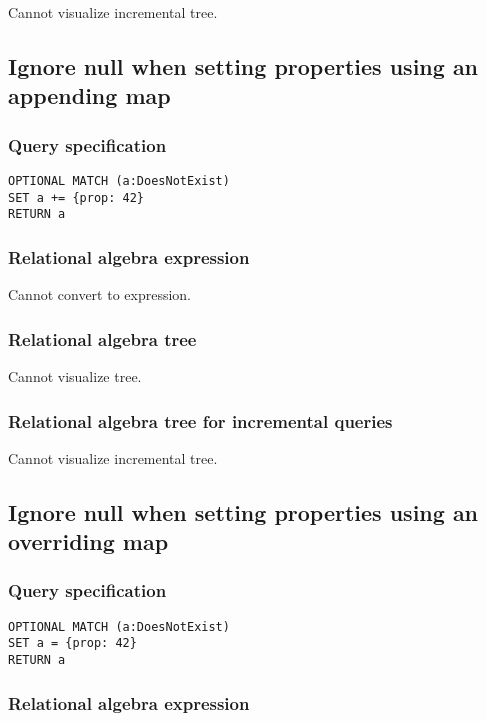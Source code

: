 Cannot visualize incremental tree.

\subsection{Ignore null when setting properties using an appending map}

\subsubsection*{Query specification}

\begin{lstlisting}
OPTIONAL MATCH (a:DoesNotExist)
SET a += {prop: 42}
RETURN a
\end{lstlisting}

\subsubsection*{Relational algebra expression}

Cannot convert to expression.

\subsubsection*{Relational algebra tree}

Cannot visualize tree.

\subsubsection*{Relational algebra tree for incremental queries}

Cannot visualize incremental tree.

\subsection{Ignore null when setting properties using an overriding map}

\subsubsection*{Query specification}

\begin{lstlisting}
OPTIONAL MATCH (a:DoesNotExist)
SET a = {prop: 42}
RETURN a
\end{lstlisting}

\subsubsection*{Relational algebra expression}

